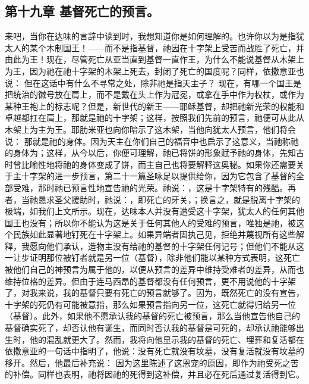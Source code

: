 
\subsection{第十九章 基督死亡的预言。}

来吧，当你在达味的言辞中读到时，我想知道你是如何理解的。也许你以为是指犹太人的某个木制国王！——而不是指基督，祂因在十字架上受苦而战胜了死亡，并由此为王！现在，尽管死亡从亚当直到基督一直作王，为什么不能说基督从木架上为王，因为祂在祂十字架的木架上死去，封闭了死亡的国度呢？同样，依撒意亚也说： 但在这话中有什么不寻常之处，除非祂是指天主子？ 现在，有哪一个国王是把统治的徽号放在肩上，而不是戴在头上作为冠冕，或拿在手中作为权杖，或作为某种王袍上的标志呢？但是，新世代的新王——耶稣基督，却把祂新光荣的权能和卓越都扛在肩上，那就是祂的十字架；这样，按照我们先前的预言，祂便可从此从木架上为主为王。耶肋米亚也向你暗示了这木架，当他向犹太人预言，他们将会说： 那就是祂的身体。因为天主在你们自己的福音中也启示了这意义，当祂称祂的身体为；这样，从今以后，你便可理解，祂已将饼的形象赋予祂的身体，先知古时曾比喻性地将祂的身体变成了饼，而主自己也将要解释这奥秘。如果你还需要关于主十字架的进一步预言，第二十一篇圣咏足以提供给你，因为它包含了基督的全部受难，那时祂已预言性地宣告祂的光荣。祂说：，这是十字架特有的残酷。再者，当祂恳求圣父援助时，祂说：，即死亡的牙关，；换言之，就是脱离十字架的极端，如我们上文所示。现在，达味本人并没有遭受这十字架，犹太人的任何其他国王也没有；所以你不能认为这是关于任何其他人的受难的预言，唯独是祂，被这个民族如此显著地钉死在十字架上。如果异端者固执己见，拒绝并蔑视所有这些解释，我愿向他们承认，造物主没有给祂的基督的十字架任何记号；但他们不能从这一让步证明那位被钉者就是另一位（基督），除非他们能以某种方式表明，这死亡被他们自己的神预言为属于他的，以便从预言的差异中维持受难者的差异，从而也维持位格的差异。但由于连马西昂的基督都没有任何预言，更不用说他的十字架了，对我来说，我的基督只要有死亡的预言就够了。因为，既然死亡的没有宣告，十字架的死仍有可能被意指，那么如果预言指向另一位，这死亡就得归给另一位（基督）。此外，如果他不愿承认我的基督的死亡被预言，那么当他宣告他自己的基督确实死了，却否认他有诞生，而同时否认我的基督是可死的，却承认祂能够出生时，他的混乱就更大了。然而，我将向他显示我的基督的死亡、埋葬和复活都在依撒意亚的一句话中指明了，他说：没有死亡就没有坟墓，没有复活就没有坟墓的移开。然后，他最后补充说： 因为这里陈述了这恩宠的原因，即作为祂受死之苦的补偿。同样也表明，祂将因祂的死得到这补偿，并且必在死后通过复活得到它。\par

